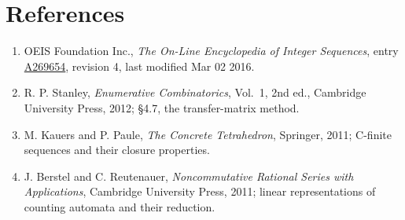 \documentclass[11pt]{article}
\theoremstyle{definition}
\begin{document}
\section{References}

\begin{enumerate}

\item OEIS Foundation Inc., \emph{The On-Line Encyclopedia of Integer Sequences}, entry \href{https://oeis.org/A269654}{A269654}, revision 4, last modified Mar 02 2016.

\item R. P. Stanley, \emph{Enumerative Combinatorics}, Vol.~1, 2nd ed., Cambridge University Press, 2012; \S4.7, the transfer-matrix method.

\item M. Kauers and P. Paule, \emph{The Concrete Tetrahedron}, Springer, 2011; C-finite sequences and their closure properties.

\item J. Berstel and C. Reutenauer, \emph{Noncommutative Rational Series with Applications}, Cambridge University Press, 2011; linear representations of counting automata and their reduction.

\end{enumerate}
\end{document}
